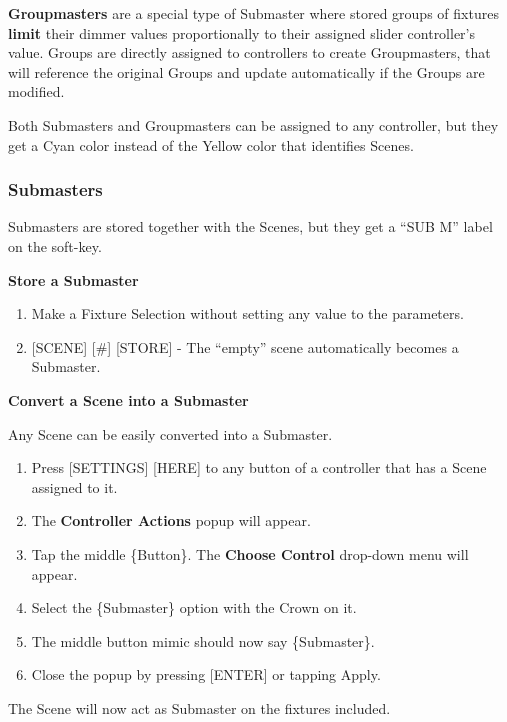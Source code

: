 \documentclass[
]{article}
\begin{document}
\textbf{Groupmasters} are a special type of Submaster where stored groups of fixtures \textbf{limit} their dimmer values proportionally to their assigned slider controller's value. Groups are directly assigned to controllers to create Groupmasters, that will reference the original Groups and update automatically if the Groups are modified.

Both Submasters and Groupmasters can be assigned to any controller, but they get a Cyan color instead of the Yellow color that identifies Scenes.

\hypertarget{submasters}{%
\subsubsection{Submasters}\label{submasters}}

Submasters are stored together with the Scenes, but they get a ``SUB M'' label on the soft-key.

\textbf{Store a Submaster}

\begin{enumerate}
\def\labelenumi{\arabic{enumi}.}
\item
  Make a Fixture Selection without setting any value to the parameters.
\item
  {[}SCENE{]} {[}\#{]} {[}STORE{]} - The ``empty'' scene automatically becomes a Submaster.
\end{enumerate}

\textbf{Convert a Scene into a Submaster}

Any Scene can be easily converted into a Submaster.

\begin{enumerate}
\def\labelenumi{\arabic{enumi}.}
\item
  Press {[}SETTINGS{]} {[}HERE{]} to any button of a controller that has a Scene assigned to it.
\item
  The \textbf{Controller Actions} popup will appear.
\item
  Tap the middle \{Button\}. The \textbf{Choose Control} drop-down menu will appear.
\item
  Select the \{Submaster\} option with the Crown on it.
\item
  The middle button mimic should now say \{Submaster\}.
\item
  Close the popup by pressing {[}ENTER{]} or tapping Apply.
\end{enumerate}

The Scene will now act as Submaster on the fixtures included.
\end{document}
